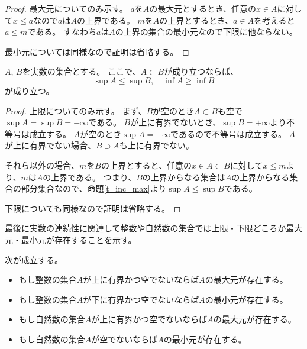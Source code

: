 \begin{proof}
最大元についてのみ示す。
$a$を$A$の最大元とするとき、任意の$x \in A$に対して$x \le a$なので$a$は$A$の上界である。
$m$を$A$の上界とするとき、$a \in A$を考えると$a \le m$である。
すなわち$a$は$A$の上界の集合の最小元なので下限に他ならない。

最小元については同様なので証明は省略する。
\end{proof}

\begin{proposition}[包含関係と上限・下限]
$A$, $B$を実数の集合とする。
ここで、$A \subset B$が成り立つならば、
$$
\sup A \le \sup B, \quad \inf A \ge \inf B
$$
が成り立つ。
\end{proposition}

\begin{proof}
上限についてのみ示す。
まず、$B$が空のとき$A \subset B$も空で$\sup A = \sup B = -\infty$である。
$B$が上に有界でないとき、$\sup B = +\infty$より不等号は成立する。
$A$が空のとき$\sup A = -\infty$であるので不等号は成立する。
$A$が上に有界でない場合、$B \supset A$も上に有界でない。

それら以外の場合、$m$を$B$の上界とすると、任意の$x \in A \subset B$に対して$x \le m$より、$m$は$A$の上界である。
つまり、$B$の上界からなる集合は$A$の上界からなる集合の部分集合なので、命題\ref{t_inc_max}より$\sup A \le \sup B$である。

下限についても同様なので証明は省略する。
\end{proof}

最後に実数の連続性に関連して整数や自然数の集合では上限・下限どころか最大元・最小元が存在することを示す。

\begin{proposition}
\label{t_maxdisc}
次が成立する。
\begin{itemize}
\item
もし整数の集合$A$が上に有界かつ空でないならば$A$の最大元が存在する。
\item
もし整数の集合$A$が下に有界かつ空でないならば$A$の最小元が存在する。
\item
もし自然数の集合$A$が上に有界かつ空でないならば$A$の最大元が存在する。
\item
もし自然数の集合$A$が空でないならば$A$の最小元が存在する。
\end{itemize}
\end{proposition}

